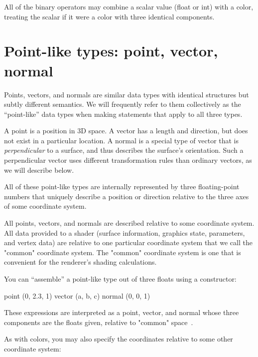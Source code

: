 \documentclass[11pt,letterpaper]{book}
\def\color{{\cf color}\xspace}
\def\float{{\cf float}\xspace}
\def\inttype{{\cf int}\xspace}
\def\normal{{\cf normal}\xspace}
\def\point{{\cf point}\xspace}
\def\vector{{\cf vector}\xspace}
\def\commonspace{{\cf "common"} space\xspace}
\begin{document}
All of the binary operators may combine a scalar value (\float or
\inttype) with a \color, treating the scalar if it were a \color with
three identical components.


\section{Point-like types: {\cf point}, {\cf vector}, {\cf normal}}
\label{sec:types:point}
  
  

Points, vectors, and normals are similar data types with identical
structures but subtly different semantics.  We will frequently refer to
them collectively as the ``point-like'' data types when making
statements that apply to all three types.

A \point is a position in 3D space.  A \vector has a length and
direction, but does not exist in a particular location.  A \normal is a
special type of vector that is \emph{perpendicular} to a surface, and
thus describes the surface's orientation.  Such a perpendicular vector
uses different transformation rules than ordinary vectors, as we will
describe below.

All of these point-like types are internally represented by three
floating-point numbers that uniquely describe a position or
direction relative to the three axes of some coordinate system.  

All points, vectors, and normals are described relative to some
coordinate system.  All data provided to a shader (surface information,
graphics state, parameters, and vertex data) are relative to one
particular coordinate system that we call the {\cf "common"} coordinate
system.  The {\cf "common"} coordinate system is one that is convenient
for the renderer's shading calculations.
\label{sect:commonspace}

You can ``assemble'' a point-like type out of three floats using a
constructor:

\begin{code}
        point (0, 2.3, 1)
        vector (a, b, c)
        normal (0, 0, 1)
\end{code}

\noindent These expressions are interpreted as a point, vector, and normal
whose three components are the floats given, relative to \commonspace\ .

As with colors, you may also specify the coordinates relative to some other
coordinate system:
\end{document}
